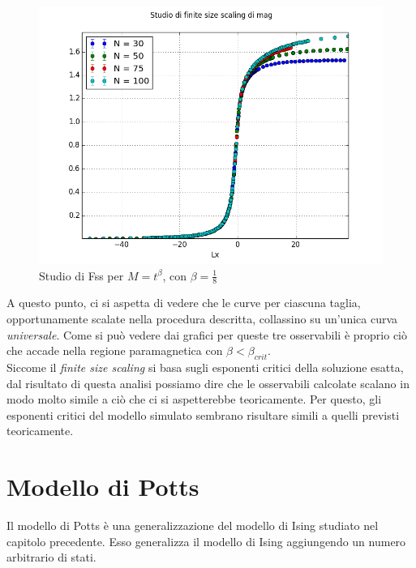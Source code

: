 \begin{center}
	\begin{figure}[h!]
		\includegraphics[scale=0.56]{sw/fssmag.png}
		\caption{Studio di Fss per $M= t^{\beta}$, con $\beta=\frac{1}{8}$}
	\end{figure}
\end{center}

A questo punto, ci si aspetta di vedere che le curve per ciascuna taglia, opportunamente scalate nella procedura descritta, collassino su un'unica curva \emph{universale}.
Come si può vedere dai grafici per queste tre osservabili è proprio ciò che accade nella regione paramagnetica con $\beta < \beta_{crit}$.\\
Siccome il \emph{finite size scaling} si basa sugli esponenti critici della soluzione esatta, dal risultato di questa analisi possiamo dire che le osservabili calcolate scalano in modo molto simile a ciò che ci si aspetterebbe teoricamente.
Per questo, gli esponenti critici del modello simulato sembrano risultare simili a quelli previsti teoricamente.

\newpage
\section{Modello di Potts}
Il modello di Potts è una generalizzazione del modello di Ising studiato nel capitolo precedente.
Esso generalizza il modello di Ising aggiungendo un numero arbitrario di stati.


